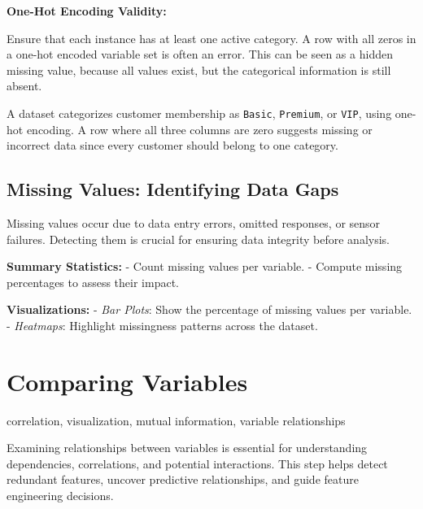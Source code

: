 \documentclass[12pt,openany]{book}
\begin{document}
\textbf{One-Hot Encoding Validity:}

Ensure that each instance has at least one active category. A row with all zeros in a one-hot encoded variable set is often an error. This can be seen as a hidden missing value, because all values exist, but the categorical information is still absent.

\begin{examplebox}
A dataset categorizes customer membership as \texttt{Basic}, \texttt{Premium}, or \texttt{VIP}, using one-hot encoding. A row where all three columns are zero suggests missing or incorrect data since every customer should belong to one category.
\end{examplebox}


\subsection{Missing Values: Identifying Data Gaps}

Missing values occur due to data entry errors, omitted responses, or sensor failures. 
Detecting them is crucial for ensuring data integrity before analysis.
\newline

\textbf{Summary Statistics:}  
\newline
- Count missing values per variable.  
- Compute missing percentages to assess their impact.  
\newline

\textbf{Visualizations:}  
\newline
- \textit{Bar Plots}: Show the percentage of missing values per variable.  
- \textit{Heatmaps}: Highlight missingness patterns across the dataset.  
\newline



\section{Comparing Variables}

\begin{keywordsbox}
correlation, visualization, mutual information, variable relationships
\end{keywordsbox}

Examining relationships between variables is essential for understanding dependencies, correlations, and potential interactions. This step helps detect redundant features, uncover predictive relationships, and guide feature engineering decisions. 
\end{document}
